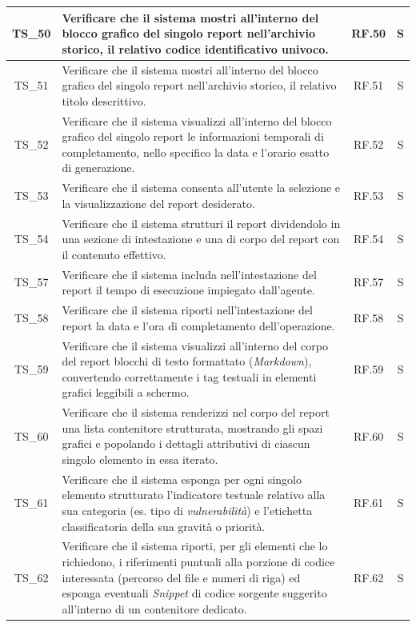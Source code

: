 \documentclass[12pt, a4paper]{article}
\newlength{\LargColVal} %
\begin{document}
\begin{xltabular}{\textwidth}{|c|X|C{\LargColVal}|C{\LargColVal}|}
    TS\_50 & Verificare che il sistema mostri all'interno del blocco grafico del singolo report nell'archivio storico, il relativo codice identificativo univoco. & RF.50 & S \\ \hline
    TS\_51 & Verificare che il sistema mostri all'interno del blocco grafico del singolo report nell'archivio storico, il relativo titolo descrittivo. & RF.51 & S \\ \hline
    TS\_52 & Verificare che il sistema visualizzi all'interno del blocco grafico del singolo report le informazioni temporali di completamento, nello specifico la data e l'orario esatto di generazione. & RF.52 & S \\ \hline
    TS\_53 & Verificare che il sistema consenta all'utente la selezione e la visualizzazione del report desiderato. & RF.53 & S \\ \hline
    TS\_54 & Verificare che il sistema strutturi il report dividendolo in una sezione di intestazione e una di corpo del report con il contenuto effettivo. & RF.54 & S \\ \hline
    TS\_57 & Verificare che il sistema includa nell'intestazione del report il tempo di esecuzione impiegato dall'agente. & RF.57 & S \\ \hline
    TS\_58 & Verificare che il sistema riporti nell'intestazione del report la data e l'ora di completamento dell'operazione. & RF.58 & S \\ \hline
    TS\_59 & Verificare che il sistema visualizzi all'interno del corpo del report blocchi di testo formattato (\textit{Markdown}), convertendo correttamente i tag testuali in elementi grafici leggibili a schermo. & RF.59 & S \\ \hline
    TS\_60 & Verificare che il sistema renderizzi nel corpo del report una lista contenitore strutturata, mostrando gli spazi grafici e popolando i dettagli attributivi di ciascun singolo elemento in essa iterato. & RF.60 & S \\ \hline
    TS\_61 & Verificare che il sistema esponga per ogni singolo elemento strutturato l'indicatore testuale relativo alla sua categoria (es. tipo di \textit{vulnerabilità}) e l'etichetta classificatoria della sua gravità o priorità. & RF.61 & S \\ \hline
    TS\_62 & Verificare che il sistema riporti, per gli elementi che lo richiedono, i riferimenti puntuali alla porzione di codice interessata (percorso del file e numeri di riga) ed esponga eventuali \textit{Snippet} di codice sorgente suggerito all'interno di un contenitore dedicato. & RF.62 & S \\ \hline

\end{xltabular}
\end{document}
